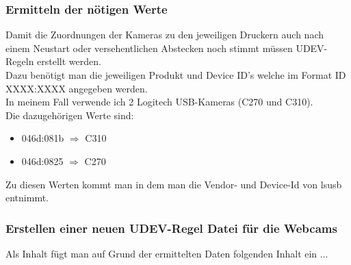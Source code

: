 \subsubsection{Ermitteln der nötigen Werte}
Damit die Zuordnungen der Kameras zu den jeweiligen Druckern auch nach einem Neustart oder versehentlichen Abstecken noch stimmt müssen UDEV-Regeln erstellt werden. \\

Dazu benötigt man die jeweiligen Produkt und Device ID's welche im Format  ID XXXX:XXXX angegeben werden. \\

In meinem Fall verwende ich 2 Logitech USB-Kameras (C270 und C310). \\

Die dazugehörigen Werte sind:
\begin{itemize}
  \item 046d:081b $\Rightarrow$ C310
  \item 046d:0825 $\Rightarrow$ C270
\end{itemize}

\newpage
Zu diesen Werten kommt man in dem man die Vendor- und Device-Id von lsusb entnimmt. \\


\newpage
\subsubsection{Erstellen einer neuen UDEV-Regel Datei für die Webcams}
\vspace{0.3cm}

Als Inhalt fügt man auf Grund der ermittelten Daten folgenden Inhalt ein ... \\


